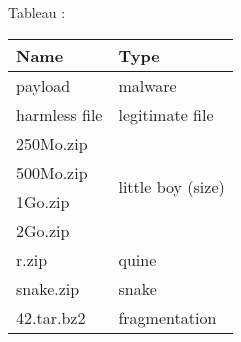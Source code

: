 \documentclass{article}           %
\title{}     %
\author{}        %
\begin{document}

Tableau :
\begin{table}[ht!]
	\begin{center}
		\begin{normalsize}
			\begin{tabular}{|l|l|}
    				\hline
     			\textbf{Name} & \textbf{Type}\\
                \hline
                payload & malware \\
    				\hline
    				harmless file & legitimate file\\
    				\hline
    				250Mo.zip & \multirow{ 4}{*}{little boy (size)} \\
    				500Mo.zip &  \\
    				1Go.zip &  \\
    				2Go.zip &  \\
    				\hline
    				r.zip &  quine\\
    				\hline
    				snake.zip &  snake\\
    				\hline
    				42.tar.bz2 & fragmentation \\
    				\hline
 			\end{tabular}
 		\end{normalsize}
	\end{center}
\end{table}
\end{document}
